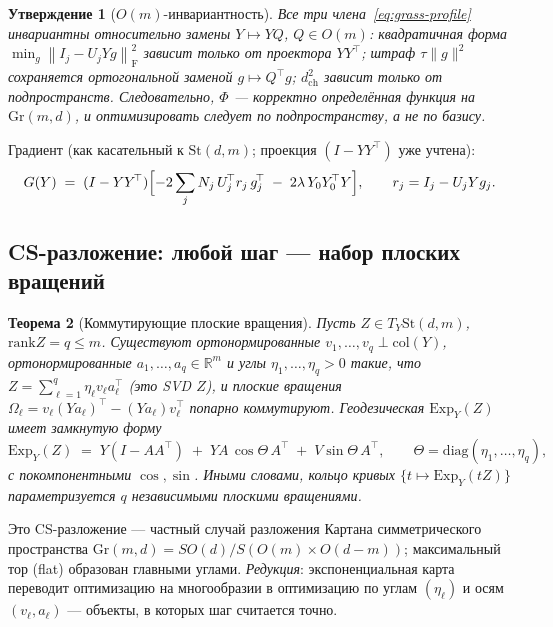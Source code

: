 \documentclass[11pt,a4paper]{article}
\newcommand{\R}{\mathbb{R}}
\newcommand{\Id}{I}
\newcommand{\T}{^{\!\top}}
\newcommand{\F}{\mathrm{F}}
\newcommand{\Gr}{\mathrm{Gr}}
\newcommand{\St}{\mathrm{St}}
\newcommand{\Exp}{\mathrm{Exp}}
\newcommand{\col}{\mathrm{col}}
\newcommand{\rank}{\mathrm{rank}}
\newcommand{\dg}{\mathrm{diag}}
\newcommand{\dch}{d_{\mathrm{ch}}}
\newcommand{\erm}[1]{\left\|#1\right\|_{\F}}
\theoremstyle{plain}
\newtheorem{theorem}{Теорема}[section]
\newtheorem{prop}[theorem]{Утверждение}
\theoremstyle{definition}
\theoremstyle{remark}
\begin{document}
\begin{prop}[$O(m)$-инвариантность]\label{prop:invariance}
Все три члена~\eqref{eq:grass-profile} инвариантны относительно замены
$Y\mapsto YQ$, $Q\in O(m)$: квадратичная форма
$\min_g\erm{I_j-U_jYg}^2$ зависит только от проектора $YY\T$; штраф $\tau\|g\|^2$
сохраняется ортогональной заменой $g\mapsto Q\T g$; $\dch^2$ зависит только от
подпространств. Следовательно, $\Phi$ --- корректно определённая функция на
$\Gr(m,d)$, и оптимизировать следует по подпространству, а не по базису.
\end{prop}

Градиент (как касательный к $\St(d,m)$; проекция $(\Id-YY\T)$ уже учтена):
\begin{equation}\label{eq:grass-grad}
G(Y)\;=\;(\Id-YY\T)\Bigl[-2\sum_j N_j\,U_j\T r_j\,g_j\T\;-\;2\lambda\,Y_0Y_0\T Y\Bigr],
\qquad
r_j=I_j-U_jYg_j .
\end{equation}

\subsection{CS-разложение: любой шаг --- набор плоских вращений}

\begin{theorem}[Коммутирующие плоские вращения]\label{thm:cs}
Пусть $Z\in T_Y\St(d,m)$, $\rank Z=q\le m$. Существуют ортонормированные
$v_1,\dots,v_q\perp\col(Y)$, ортонормированные $a_1,\dots,a_q\in\R^m$ и углы
$\eta_1,\dots,\eta_q>0$ такие, что $Z=\sum_{\ell=1}^q\eta_\ell v_\ell a_\ell\T$
(это SVD $Z$), и плоские вращения
$\Omega_\ell=v_\ell(Ya_\ell)\T-(Ya_\ell)v_\ell\T$ попарно коммутируют. Геодезическая
$\Exp_Y(Z)$ имеет замкнутую форму
\begin{equation}\label{eq:exp-multi}
\Exp_Y(Z)\;=\;Y(\Id-AA\T)\;+\;YA\,\cos\Theta\,A\T\;+\;V\sin\Theta\,A\T,
\qquad \Theta=\dg(\eta_1,\dots,\eta_q),
\end{equation}
с покомпонентными $\cos,\sin$. Иными словами, кольцо кривых
$\{t\mapsto\Exp_Y(tZ)\}$ параметризуется $q$ независимыми плоскими вращениями.
\end{theorem}

Это CS-разложение --- частный случай разложения Картана симметрического
пространства $\Gr(m,d)=SO(d)/S(O(m)\times O(d-m))$; максимальный тор (flat)
образован главными углами. \emph{Редукция}: экспоненциальная карта переводит
оптимизацию на многообразии в оптимизацию по углам $(\eta_\ell)$ и осям
$(v_\ell,a_\ell)$ --- объекты, в которых шаг считается точно.
\end{document}
